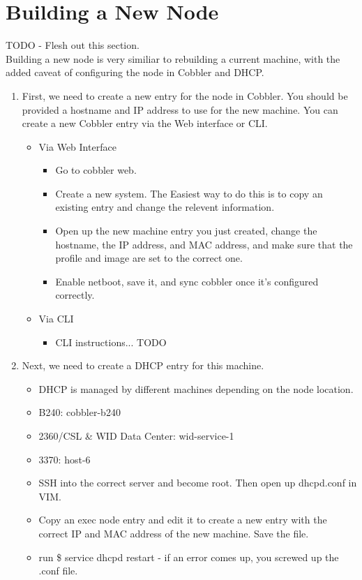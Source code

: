 \documentclass[10pt,letterpaper]{article}
\begin{document}
\section{Building a New Node}
    TODO - Flesh out this section. \\

    Building a new node is very similiar to rebuilding a current machine, with the
    added caveat of configuring the node in Cobbler and DHCP.
    \begin{enumerate}
        \item First, we need to create a new entry for the node in Cobbler. You
        should be provided a hostname and IP address to use for the new machine.
        You can create a new Cobbler entry via the Web interface or CLI.
        \begin{itemize}
            \item Via Web Interface
            \begin{itemize}
                \item Go to cobbler web.
                \item Create a new system. The Easiest way to do this is to copy
                an existing entry and change the relevent information.
                \item Open up the new machine entry you just created, change the
                hostname, the IP address, and MAC address, and make sure that
                the profile and image are set to the correct one.
                \item Enable netboot, save it, and sync cobbler once it's configured
                correctly.
            \end{itemize}
            \item Via CLI
            \begin{itemize}
                \item CLI instructions... TODO
            \end{itemize}
        \end{itemize}
        \item Next, we need to create a DHCP entry for this machine.
        \begin{itemize}
            \item DHCP is managed by different machines depending on the node location.
            \item B240: cobbler-b240
            \item 2360/CSL \& WID Data Center: wid-service-1
            \item 3370: host-6
            \item SSH into the correct server and become root. Then open up dhcpd.conf in VIM.
            \item Copy an exec node entry and edit it to create a new entry with the
            correct IP and MAC address of the new machine. Save the file.
            \item run {\selectfont \$ service dhcpd restart } - if
            an error comes up, you screwed up the .conf file.
        \end{itemize}
    \end{enumerate}
\clearpage
\end{document}
